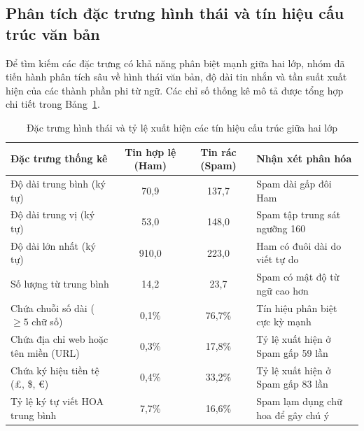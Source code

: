 \subsection{Phân tích đặc trưng hình thái và tín hiệu cấu trúc văn bản}
Để tìm kiếm các đặc trưng có khả năng phân biệt mạnh giữa hai lớp, nhóm đã tiến hành phân tích sâu về hình thái văn bản, độ dài tin nhắn và tần suất xuất hiện của các thành phần phi từ ngữ.
Các chỉ số thống kê mô tả được tổng hợp chi tiết trong Bảng~\ref{tab:tin-hieu-cau-truc}.

\begin{table}[H]
\centering
\caption{Đặc trưng hình thái và tỷ lệ xuất hiện các tín hiệu cấu trúc giữa hai lớp}
\label{tab:tin-hieu-cau-truc}
\begin{tabular}{|l|c|c|l|}
\hline
\textbf{Đặc trưng thống kê} & \textbf{Tin hợp lệ (Ham)} & \textbf{Tin rác (Spam)} & \textbf{Nhận xét phân hóa} \\
\hline
Độ dài trung bình (ký tự) & 70,9 & 137,7 & Spam dài gấp đôi Ham \\
\hline
Độ dài trung vị (ký tự) & 53,0 & 148,0 & Spam tập trung sát ngưỡng 160 \\
\hline
Độ dài lớn nhất (ký tự) & 910,0 & 223,0 & Ham có đuôi dài do viết tự do \\
\hline
Số lượng từ trung bình & 14,2 & 23,7 & Spam có mật độ từ ngữ cao hơn \\
\hline
Chứa chuỗi số dài ($\ge 5$ chữ số) & 0,1\% & 76,7\% & Tín hiệu phân biệt cực kỳ mạnh \\
\hline
Chứa địa chỉ web hoặc tên miền (URL) & 0,3\% & 17,8\% & Tỷ lệ xuất hiện ở Spam gấp 59 lần \\
\hline
Chứa ký hiệu tiền tệ (£, \$, €) & 0,4\% & 33,2\% & Tỷ lệ xuất hiện ở Spam gấp 83 lần \\
\hline
Tỷ lệ ký tự viết HOA trung bình & 7,7\% & 16,6\% & Spam lạm dụng chữ hoa để gây chú ý \\
\hline
\end{tabular}
\end{table}

